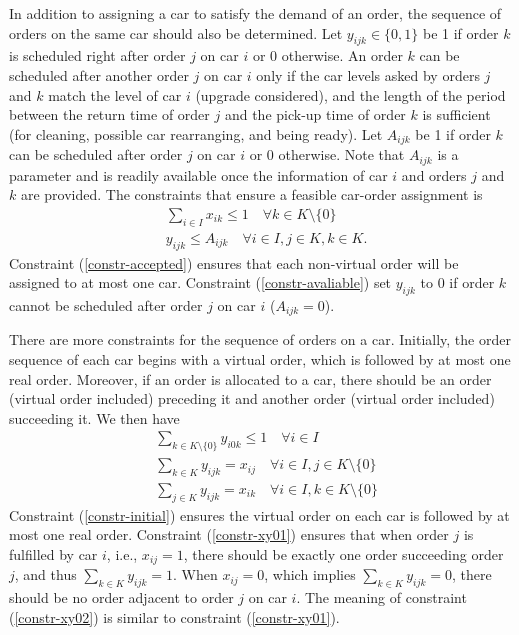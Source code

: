 \documentclass[11pt,a4paper]{article}
\begin{document}
In addition to assigning a car to satisfy the demand of an order, the sequence of orders on the same car should also be determined. Let $y_{ijk} \in \{0, 1\}$ be 1 if order $k$ is scheduled right after order $j$ on car $i$ or 0 otherwise. An order $k$ can be scheduled after another order $j$ on car $i$ only if the car levels asked by orders $j$ and $k$ match the level of car $i$ (upgrade considered), and the length of the period between the return time of order $j$ and the pick-up time of order $k$ is sufficient (for cleaning, possible car rearranging, and being ready). Let $A_{ijk}$ be 1 if order $k$ can be scheduled after order $j$ on car $i$ or 0 otherwise. Note that $A_{ijk}$ is a parameter and is readily available once the information of car $i$ and orders $j$ and $k$ are provided. The constraints that ensure a feasible car-order assignment is
\begin{align}
    & \sum_{i \in I} x_{ik} \leq 1 \quad \forall k \in K \setminus \{0\} \label{constr-accepted} \\
    & y_{ijk} \leq A_{ijk} \quad \forall i \in I, j \in K, k \in K \label{constr-avaliable}.
\end{align}
Constraint (\ref{constr-accepted}) ensures that each non-virtual order will be assigned to at most one car. Constraint (\ref{constr-avaliable}) set $y_{ijk}$ to 0 if order $k$ cannot be scheduled after order $j$ on car $i$ ($A_{ijk} = 0$).
 
There are more constraints for the sequence of orders on a car. Initially, the order sequence of each car begins with a virtual order, which is followed by at most one real order. Moreover, if an order is allocated to a car, there should be an order (virtual order included) preceding it and another order (virtual order included) succeeding it. We then have
\begin{align}
    & \sum_{k \in K \setminus \{0\}} y_{i0k} \leq 1 \quad \forall i \in I \label{constr-initial} \\
    & \sum_{k \in K} y_{ijk} = x_{ij} \quad \forall i \in I, j \in K \setminus \{0\} \label{constr-xy01} \\
    & \sum_{j \in K} y_{ijk} = x_{ik} \quad \forall i \in I, k \in K \setminus \{0\} \label{constr-xy02}
\end{align}
Constraint (\ref{constr-initial}) ensures the virtual order on each car is followed by at most one real order. Constraint (\ref{constr-xy01}) ensures that when order $j$ is fulfilled by car $i$, i.e., $x_{ij} = 1$, there should be exactly one order succeeding order $j$, and thus $\sum_{k \in K} y_{ijk} = 1$. When $x_{ij} = 0$, which implies $\sum_{k \in K} y_{ijk} = 0$, there should be no order adjacent to order $j$ on car $i$. The meaning of constraint (\ref{constr-xy02}) is similar to constraint (\ref{constr-xy01}). 
\end{document}
